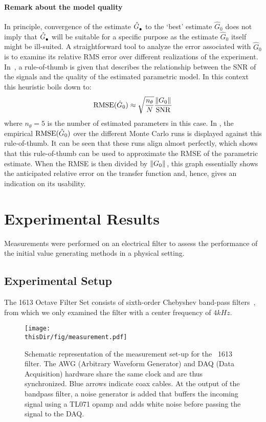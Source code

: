 \paragraph*{Remark about the model quality}
In principle, convergence of the estimate $\hat{G}_{\mathrm{\bullet}}^{\mathrm{}}$ to the `best' estimate $\hat{G}_{0}$ does not imply that $\hat{G}_{\mathrm{\bullet}}^{\mathrm{}}$ will be suitable for a specific purpose as the estimate $\hat{G}_{0}$ itself might be ill-suited.
A straightforward tool to analyze the error associated with $\hat{G}_0$ is to examine its relative RMS error over different realizations of the experiment.
In~\citep{Ljung1999}, a rule-of-thumb is given that describes the relationship between the SNR of the signals and the quality of the estimated parametric model.
In this context this heuristic boils down to: 
\begin{equation}
    \mathrm{RMSE}(\hat{G}_{0}) \approx \sqrt{\frac{n_\theta}{N}} \frac{\left\| G_0 \right\|_{}}{\mathrm{SNR}} 
    \label{eq:heur-RMSE}
\end{equation}
where $n_{\theta}=5$ is the number of estimated parameters in this case.
In , the empirical $\mathrm{RMSE}(\hat{G}_{0})$ over the different Monte Carlo runs is displayed against this rule-of-thumb.
It can be seen that these runs align almost perfectly, which shows that this rule-of-thumb can be used to approximate the RMSE of the parametric estimate.
When the RMSE is then divided by $\left\| G_0 \right\|_{}$, this graph essentially shows the anticipated relative error on the transfer function and, hence, gives an indication on its usability.

\section{Experimental Results}
\label{se:ExpMeas}
Measurements were performed on an electrical filter to assess the performance of the initial value generating methods in a physical setting.

\subsection{Experimental Setup}
The \BK{} 1613 Octave Filter Set consists of sixth-order Chebyshev band-pass filters~\citep{datasheet_bk1613}, from which we only examined the filter with a center frequency of $4\unit{kHz}$.

\begin{figure}
  \centering
  \texttt{[image: \\thisDir/fig/measurement.pdf]}
  \caption[Measurement schematic of \BK\ 1613 filter.]{Schematic representation of the measurement set-up for the \BK\ 1613 filter. The AWG (Arbitrary Waveform Generator) and DAQ (Data Acquisition) hardware share the same clock and are thus synchronized. 
  Blue arrows indicate coax cables. 
  At the output of the bandpass filter, a noise generator is added that buffers the incoming signal using a TL071 opamp and adds white noise before passing the signal to the DAQ.} 
  \label{fig:measurementSetup}
\end{figure}


